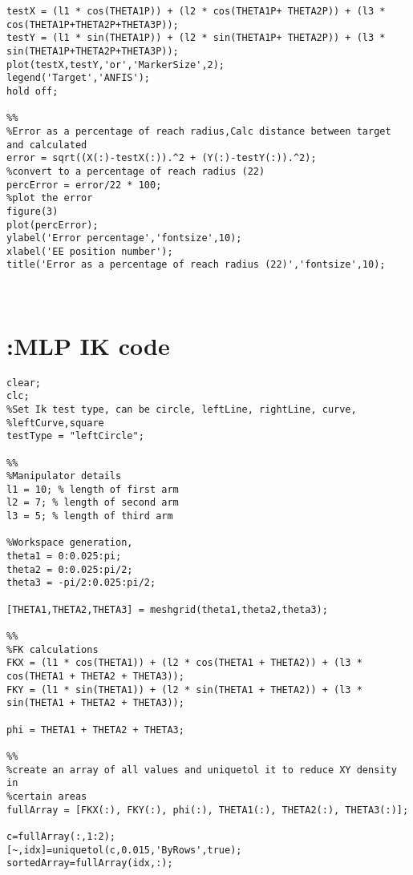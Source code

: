 \documentclass[a4paper,11pt]{article}
\begin{document}
\begin{appendices}
\begin{lstlisting}[style=Matlab-editor,basicstyle=\color{black}\ttfamily\tiny]
testX = (l1 * cos(THETA1P)) + (l2 * cos(THETA1P+ THETA2P)) + (l3 * cos(THETA1P+THETA2P+THETA3P));
testY = (l1 * sin(THETA1P)) + (l2 * sin(THETA1P+ THETA2P)) + (l3 * sin(THETA1P+THETA2P+THETA3P));
plot(testX,testY,'or','MarkerSize',2);
legend('Target','ANFIS');
hold off;

%%
%Error as a percentage of reach radius,Calc distance between target and calculated
error = sqrt((X(:)-testX(:)).^2 + (Y(:)-testY(:)).^2);
%convert to a percentage of reach radius (22)
percError = error/22 * 100;
%plot the error
figure(3)
plot(percError);
ylabel('Error percentage','fontsize',10);
xlabel('EE position number');
title('Error as a percentage of reach radius (22)','fontsize',10);



\end{lstlisting}





\newpage
\section{:MLP IK code}

\begin{lstlisting}[style=Matlab-editor,basicstyle=\color{black}\ttfamily\tiny]
%Inverse kinematics of a 3 link planar manipulator using a MLP
clear;
clc;
%Set Ik test type, can be circle, leftLine, rightLine, curve,
%leftCurve,square
testType = "leftCircle";

%%
%Manipulator details
l1 = 10; % length of first arm
l2 = 7; % length of second arm
l3 = 5; % length of third arm

%Workspace generation,
theta1 = 0:0.025:pi; 
theta2 = 0:0.025:pi/2; 
theta3 = -pi/2:0.025:pi/2; 

[THETA1,THETA2,THETA3] = meshgrid(theta1,theta2,theta3);

%%
%FK calculations
FKX = (l1 * cos(THETA1)) + (l2 * cos(THETA1 + THETA2)) + (l3 * cos(THETA1 + THETA2 + THETA3));
FKY = (l1 * sin(THETA1)) + (l2 * sin(THETA1 + THETA2)) + (l3 * sin(THETA1 + THETA2 + THETA3));

phi = THETA1 + THETA2 + THETA3; 

%%
%create an array of all values and uniquetol it to reduce XY density in
%certain areas
fullArray = [FKX(:), FKY(:), phi(:), THETA1(:), THETA2(:), THETA3(:)];

c=fullArray(:,1:2);
[~,idx]=uniquetol(c,0.015,'ByRows',true);
sortedArray=fullArray(idx,:);



\end{lstlisting}
\end{appendices}
\end{document}
